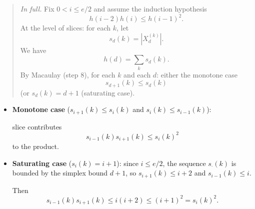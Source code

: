 \documentclass[11pt,reqno]{amsart}
\begin{document}
\begin{quotation}
\noindent%
\textit{In full.} Fix $0<i\leq e/2$ and assume the induction hypothesis%
\begin{equation*}
h(i-2)h(i)\leq h(i-1)^{2}.
\end{equation*}%
\noindent%
At the level of slices: for each $k$, let 
\begin{equation*}
s_{d}(k)=|X_{d}^{(k)}|.
\end{equation*}
\noindent%
We have%
\begin{equation*}
h(d)=\sum_{k}s_{d}(k).
\end{equation*}
\noindent%
By Macaulay (step 8), for each $k$ and each $d$: either the monotone case  $%
\ $%
\begin{equation*}
s_{d+1}(k)\leq s_{d}(k)
\end{equation*}
(or $s_{d}(k)=d+1$ (saturating case).
\end{quotation}

\begin{itemize}
\item \textbf{Monotone case} ($s_{i+1}(k)\leq s_{i}(k)$ and $s_{i}(k)\leq
s_{i-1}(k)$): 

\medskip%

\noindent%
slice contributes%
\begin{equation*}
s_{i-1}(k)s_{i+1}(k)\leq s_{i}(k)^{2}
\end{equation*}%
\noindent%
to the product.

\item \textbf{Saturating case} ($s_{i}(k)=i+1$): since $i\leq e/2$, the
sequence $s_{\cdot }(k)$ is bounded by the simplex bound $d+1$, so $%
s_{i+1}(k)\leq i+2$ and $s_{i-1}(k)\leq i$. 

\medskip%

\noindent%
Then 
\begin{equation*}
s_{i-1}(k)s_{i+1}(k)\leq i(i+2)\leq (i+1)^{2}=s_{i}(k)^{2}.
\end{equation*}
\end{itemize}
\end{document}
